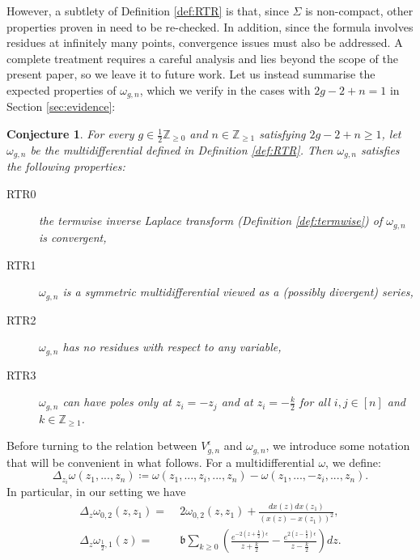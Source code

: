 \documentclass[12pt]{amsart}
\theoremstyle{plain}
\newtheorem{conjecture}[theorem]{Conjecture}
\theoremstyle{definition}
\theoremstyle{remark}
\numberwithin{equation}{section}
\begin{document}
However, a subtlety of Definition \ref{def:RTR} is that, since $\Sigma$ is non-compact, other properties proven in \cite{KO22,Osu23-1,Osu23-2} need to be re-checked. In addition, since the formula involves residues at infinitely many points, convergence issues must also be addressed. A complete treatment requires a careful analysis and lies beyond the scope of the present paper, so we leave it to future work. Let us instead summarise the expected properties of $\omega_{g,n}$, which we verify in the cases with $2g-2+n=1$ in Section \ref{sec:evidence}:
\begin{conjecture}\label{conj:RTR}
   For every $g\in\frac12\mathbb{Z}_{\geq0}$ and $n\in\mathbb{Z}_{\geq1}$ satisfying $2g-2+n\geq1$, let $\omega_{g,n}$ be the multidifferential defined in {\rm Definition \ref{def:RTR}}. Then $\omega_{g,n}$ satisfies the following properties:
    \begin{description}
     \item[{\rm RTR0}] \label{item:RTR0} the termwise inverse Laplace transform \textup{(Definition \ref{def:termwise})} of $\omega_{g,n}$ is convergent,
       \item[{\rm RTR1}] \label{item:RTR1}$\omega_{g,n}$ is a symmetric multidifferential viewed as a (possibly divergent) series,
       \item[{\rm RTR2}] \label{item:RTR2}$\omega_{g,n}$ has no residues with respect to any variable,
       \item[{\rm RTR3}] \label{item:RTR3}$\omega_{g,n}$ can have poles only at $z_i=-z_j$ and at $z_i=-\frac{k}{2}$ for all $i,j\in[n]$ and $k\in\mathbb{Z}_{\geq1}$.
   \end{description}
\end{conjecture}


Before turning to the relation between $V_{g,n}^\epsilon$ and $\omega_{g,n}$, we introduce some notation that will be convenient in what follows. For a multidifferential $\omega$, we define:
\begin{equation*}
\Delta_{z_i}\omega(z_1,...,z_n)\coloneqq\omega(z_1,...,z_i,...,z_n)-\omega(z_1,...,-z_i,...,z_n).
\end{equation*}
In particular, in our setting we have
\begin{align}
\Delta_z\omega_{0,2}(z,z_1)=&\;2\omega_{0,2}(z,z_1)+\frac{dx(z)dx(z_1)}{(x(z)-x(z_1))^2},\label{Delta_0,2}\\
\Delta_z\omega_{\frac12,1}(z)=&\;\mathfrak{b}\sum_{k\geq0}\left(\frac{e^{-2(z+\frac{k}{2})\epsilon}}{z+\frac{k}{2}}-\frac{e^{2(z-\frac{k}{2})\epsilon}}{z-\frac{k}{2}}\right)dz.
\end{align}
\end{document}

